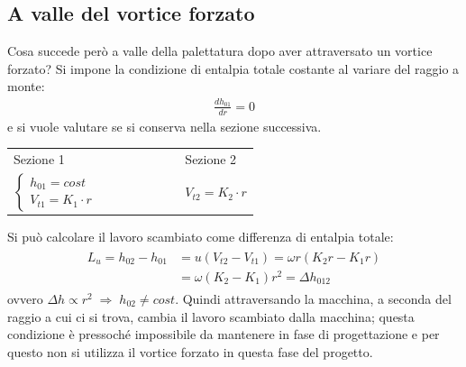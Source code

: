 \subsection{A valle del vortice forzato}
Cosa succede però a valle della palettatura dopo aver attraversato un vortice forzato? Si impone la condizione di entalpia totale costante al variare del raggio a monte:
\begin{align*}
\frac{dh_{01}}{dr} = 0
\end{align*}
e si vuole valutare se si conserva nella sezione successiva.
\begin{center}
\begin{tabular}{l l l l l l l l }
	Sezione 1 & & & & & & &   Sezione 2\\
	$
	\begin{cases}
		h_{01} = cost\\
		V_{t1} = K_1 \cdot r
	\end{cases}$ & & & & & & &   $V_{t2} = K_2 \cdot r$
\end{tabular}
\end{center}
Si può calcolare il lavoro scambiato come differenza di entalpia totale:
\begin{align*}
\begin{split}
L_u=h_{02} - h_{01} &= u (V_{t2} - V_{t1} ) = \omega r (K_2 r - K_1 r) \\
&= \omega (K_2 - K_1) r^2 = \Delta h_{012}
\end{split}
\end{align*}
ovvero $\Delta h \propto r^2 \; \Rightarrow \; h_{02} \neq  cost$. Quindi attraversando la macchina, a seconda del raggio a cui ci si trova, cambia il lavoro scambiato dalla macchina; questa condizione è pressoché impossibile da mantenere in fase di progettazione e per questo non si utilizza il vortice forzato in questa fase del progetto.


